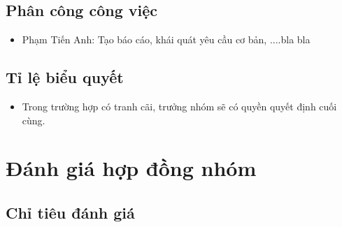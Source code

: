 \documentclass[a4paper, 12pt]{article}
\begin{document}
\subsection{Phân công công việc}
\begin{itemize}
    \item Phạm Tiến Anh: Tạo báo cáo, khái quát yêu cầu cơ bản, ....bla bla

\end{itemize}

\subsection{Tỉ lệ biểu quyết}
\begin{itemize}
    \item Trong trường hợp có tranh cãi, trưởng nhóm sẽ có quyền quyết định cuối cùng.
\end{itemize}

\newpage
\section{Đánh giá hợp đồng nhóm}
\subsection{Chỉ tiêu đánh giá}
\end{document}
